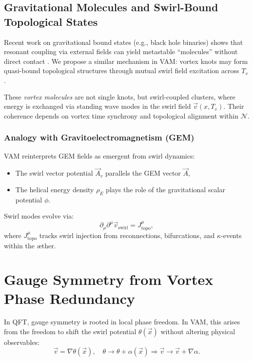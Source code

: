 \subsection{Gravitational Molecules and Swirl-Bound Topological States}

Recent work on gravitational bound states (e.g., black hole binaries) shows that resonant coupling via external fields can yield metastable “molecules” without direct contact \cite{baumann2023black}. We propose a similar mechanism in VAM: vortex knots may form quasi-bound topological structures through mutual swirl field excitation across \( T_v \).

These \textit{vortex molecules} are not single knots, but swirl-coupled clusters, where energy is exchanged via standing wave modes in the swirl field \( \vec{v}(x, T_v) \). Their coherence depends on vortex time synchrony and topological alignment within $\mathcal{N}$.

\subsubsection*{Analogy with Gravitoelectromagnetism (GEM)}

VAM reinterprets GEM fields as emergent from swirl dynamics:
\begin{itemize}
  \item The swirl vector potential \( \vec{A}_v \) parallels the GEM vector \( \vec{A} \),
  \item The helical energy density \( \rho_{\scriptscriptstyle\boldsymbol\!E}\) plays the role of the gravitational scalar potential \( \phi \).
\end{itemize}

Swirl modes evolve via:
\[
\partial_\mu \partial^\mu \vec{v}_\text{swirl} = J^\mu_\text{topo},
\]
where \( J^\mu_\text{topo} \) tracks swirl injection from reconnections, bifurcations, and $ \kappa $-events within the æther.

\section*{Gauge Symmetry from Vortex Phase Redundancy}

In QFT, gauge symmetry is rooted in local phase freedom. In VAM, this arises from the freedom to shift the swirl potential \( \theta(\vec{x}) \) without altering physical observables:
\[
\vec{v} = \nabla \theta(\vec{x}), \quad \theta \to \theta + \alpha(\vec{x}) \Rightarrow \vec{v} \to \vec{v} + \nabla \alpha.
\]

